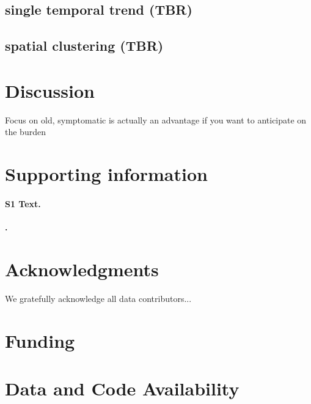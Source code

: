 \documentclass[10pt,letterpaper]{article}
\begin{document}
\subsection{single temporal trend (TBR)}

\subsection{spatial clustering (TBR)}

\section{Discussion}

Focus on old, symptomatic is actually an advantage if you want to anticipate on the burden



\nolinenumbers

\section*{Supporting information}


\paragraph*{S1 Text.}
\label{supp1}
{\bf .}


\section*{Acknowledgments}

We gratefully acknowledge all data contributors...


\section*{Funding}


\section*{Data and Code Availability}



\end{document}
